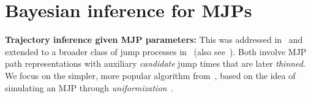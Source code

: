 \section{Bayesian inference for MJPs}
\textbf{Trajectory inference given MJP parameters:}
This was addressed in~\cite{RaoTeh13}  
and extended to a broader class of 
jump processes %
in~\cite{RaoTeh12} (also see~\cite{FearnSher2006, 
Hobolth09, Elhaygibbssampling}). %
Both involve MJP path representations with auxiliary 
{\em candidate} jump times that are later {\em thinned}.  We focus on 
the simpler, more popular algorithm from~\cite{RaoTeh13},
based on the idea of simulating an MJP through {\em uniformization}~\citep{Jen1953}. 


